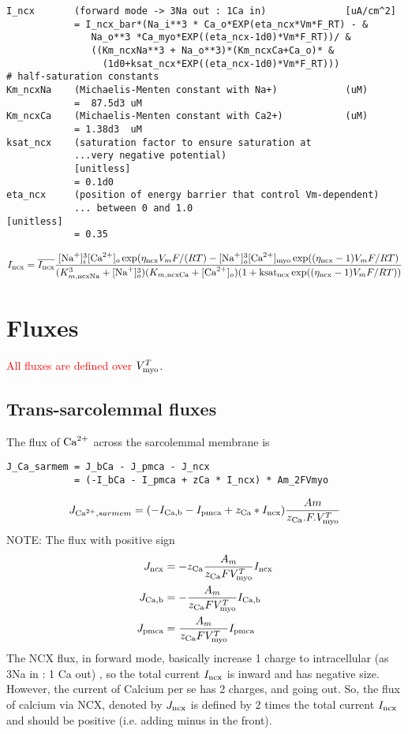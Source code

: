 \begin{verbatim}
I_ncx       (forward mode -> 3Na out : 1Ca in)              [uA/cm^2]
            = I_ncx_bar*(Na_i**3 * Ca_o*EXP(eta_ncx*Vm*F_RT) - &
               Na_o**3 *Ca_myo*EXP((eta_ncx-1d0)*Vm*F_RT))/ &
               ((Km_ncxNa**3 + Na_o**3)*(Km_ncxCa+Ca_o)* &
                 (1d0+ksat_ncx*EXP((eta_ncx-1d0)*Vm*F_RT)))
# half-saturation constants
Km_ncxNa    (Michaelis-Menten constant with Na+)            (uM)
            =  87.5d3 uM
Km_ncxCa    (Michaelis-Menten constant with Ca2+)           (uM)
            = 1.38d3  uM
ksat_ncx    (saturation factor to ensure saturation at 
            ...very negative potential)
            [unitless]
            = 0.1d0 
eta_ncx     (position of energy barrier that control Vm-dependent)
            ... between 0 and 1.0                            [unitless]
            = 0.35    
\end{verbatim}
\begin{equation}
  \label{eq:11}
    I_{\text{ncx}} = \overline{I_{\text{ncx}}}\frac{[{\text{Na}^+}]_i^3 [{\text{Ca}^{2+}}]_o\exp(\eta_{\text{ncx}}
      V_mF/(RT)-[{\text{Na}^+}]_o^3[{\text{Ca}^{2+}}]_{\text{myo}}\exp((\eta_{\text{ncx}}-1)V_mF/RT)}{(K_{m,\text{ncx}
        {\text{Na}}}^3+[{\text{Na}^+}]_o^3)(K_{m,\text{ncx} {\text{Ca}}}+[{\text{Ca}^{2+}}]_o)(1+{\text{ksat}}_{\text{ncx}}\exp((\eta_{\text{ncx}}-1)V_mF/RT))} 
\end{equation}

\section{Fluxes}
\label{sec:fluxes}

\textcolor{red}{All fluxes are defined over $V_{\text{myo}}^T$}. 

\subsection{Trans-sarcolemmal fluxes}
\label{sec:trans-sarc-flux}

The flux of ${\text{Ca}^{2+}}$ across the sarcolemmal membrane is
\begin{verbatim}
J_Ca_sarmem = J_bCa - J_pmca - J_ncx
            = (-I_bCa - I_pmca + zCa * I_ncx) * Am_2FVmyo  
\end{verbatim}
\begin{equation}
  \label{eq:13}
  J_{{\text{Ca}^{2+}},sarmem} = (-I_{\text{Ca,b}} - I_{\text{pmca}} + z_{\text{Ca}} * I_{\text{ncx}})
  \frac{Am}{z_{\text{Ca}}.F.V_{\text{myo}}^T} 
\end{equation}
NOTE: The flux with positive sign
\begin{equation}
  \label{eq:35}
  \begin{split}
    J_{\text{ncx}} &= -z_{\text{Ca}} \frac{A_m}{z_{\text{Ca}} FV_{\text{myo}}^T} I_{\text{ncx}} \\
    J_{\text{Ca,b}} &= -\frac{A_m}{z_{\text{Ca}} FV_{\text{myo}}^T} I_{\text{Ca,b}} \\
    J_{\text{pmca}} &= \frac{A_m}{z_{\text{Ca}} FV_{\text{myo}}^T} I_{\text{pmca}} 
  \end{split}
\end{equation}
The NCX flux, in forward mode, basically increase 1 charge to
intracellular (as 3Na in : 1 Ca out) , so the total current $I_{\text{ncx}}$
is inward and has negative size. However, the current of Calcium per
se has 2 charges, and going out. So, the flux of calcium via NCX,
denoted by $J_{\text{ncx}}$ is defined by 2 times the total current $I_{\text{ncx}}$
and should be positive (i.e. adding minus in the front).

